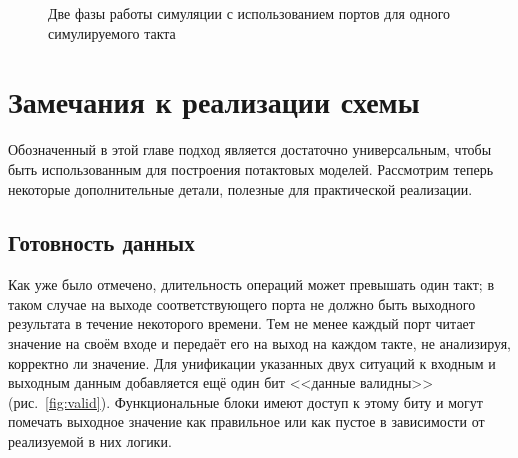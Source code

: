 \begin{figure}[htbp]
{{
} %
    \label{fig:cycle-phase2}
}
\caption[Две фазы работы потактовой симуляции с использованием портов]{Две фазы работы симуляции с использованием портов для одного симулируемого такта}
\end{figure}


\section{Замечания к реализации схемы}

Обозначенный в этой главе подход является достаточно универсальным, чтобы быть использованным для построения потактовых моделей. Рассмотрим теперь  некоторые дополнительные детали, полезные для практической реализации.

\subsection{Готовность данных}

Как уже было отмечено, длительность операций может превышать один такт; в таком случае на выходе соответствующего порта не должно быть выходного результата в течение некоторого времени. Тем не менее каждый порт читает значение на своём входе и передаёт его на выход на каждом такте, не анализируя, корректно ли значение. Для унификации указанных двух ситуаций к входным и выходным данным добавляется ещё один бит <<данные валидны>> (рис.~\ref{fig:valid}). Функциональные блоки имеют доступ к этому биту и могут помечать выходное значение как правильное или как пустое в зависимости от реализуемой в них логики.

